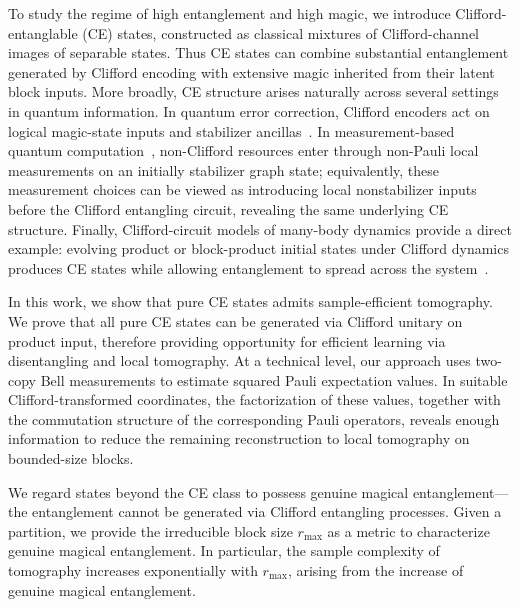 \documentclass[
  aps,
  prx,
  reprint,
  superscriptaddress,
  amsmath,
  amssymb,
  nofootinbib,
  longbibliography
]{revtex4-2}
\begin{document}
To study the regime of high entanglement and high magic, we introduce Clifford-entanglable (CE) states, constructed as classical mixtures of Clifford-channel images of separable states.
Thus CE states can combine substantial entanglement generated by Clifford encoding with extensive magic inherited from their latent block inputs.
More broadly, CE structure arises naturally across several settings in quantum information. In quantum error correction, Clifford encoders act on logical magic-state inputs and stabilizer ancillas~\cite{Gottesman1997,BravyiKitaev2005}. In measurement-based quantum computation~\cite{RaussendorfBrowneBriegel2003,HeinEisertBriegel2004}, non-Clifford resources enter through non-Pauli local measurements on an initially stabilizer graph state; equivalently, these measurement choices can be viewed as introducing local nonstabilizer inputs before the Clifford entangling circuit, revealing the same underlying CE structure. Finally, Clifford-circuit models of many-body dynamics provide a direct example: evolving product or block-product initial states under Clifford dynamics produces CE states while allowing entanglement to spread across the system~\cite{RichterLuntPal2023}.

In this work, we show that pure CE states admits sample-efficient tomography. We prove that all pure CE states can be generated via Clifford unitary on product input, therefore providing opportunity for efficient learning via disentangling and local tomography. At a technical level, our approach uses two-copy Bell measurements to estimate squared Pauli expectation values. In suitable Clifford-transformed coordinates, the factorization of these values, together with the commutation structure of the corresponding Pauli operators, reveals enough information to reduce the remaining reconstruction to local tomography on bounded-size blocks. 

We regard states beyond the CE class to possess genuine magical entanglement---the entanglement cannot be generated via Clifford entangling processes. Given a partition, we provide the irreducible block size $r_{\max}$ as a metric to characterize genuine magical entanglement. In particular, the sample complexity of tomography increases exponentially with $r_{\max}$, arising from the increase of genuine magical entanglement.
\end{document}
